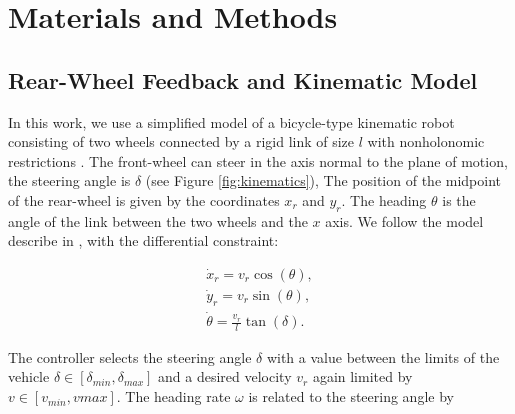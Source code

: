 \documentclass[symmetry,article,submit,moreauthors,pdftex]{Definitions/mdpi}
\begin{document}
 
\section{Materials and Methods}\label{MatAndMethods}

\subsection{Rear-Wheel Feedback and Kinematic Model}

In this work, we use a simplified model of a bicycle-type kinematic robot
consisting of two wheels connected by a rigid link of size $l$ with
nonholonomic restrictions \cite{pamucar_vehicle_2018,de1998feedback}.  The
front-wheel can steer in the axis normal to the plane of motion, the steering
angle is $\delta$ (see Figure \ref{fig:kinematics}), The position of the
midpoint of the rear-wheel is given by the coordinates $x_r$ and $y_r$. The
heading $\theta$ is the angle of the link between the two wheels and the $x$
axis.  We follow the model describe in \cite{paden_survey_2016}, with the
differential constraint:

\begin{equation}
    \begin{matrix}
        \dot{x}_{r}  = v_r \cos (\theta),\\ 
        \dot{y}_{r}  = v_r \sin (\theta),\\
        \dot{\theta} = \frac{v_r}{l} \tan (\delta).
    \end{matrix}
\end{equation}

The controller selects the steering angle $\delta$ with a value between the
limits of the vehicle $\delta \in [\delta_{min},\delta_{max}]$ and a desired
velocity $v_r$ again limited by $v\in [v_{min},v{max}]$. The heading rate
$\omega$ is related to the steering angle by 
\end{document}
